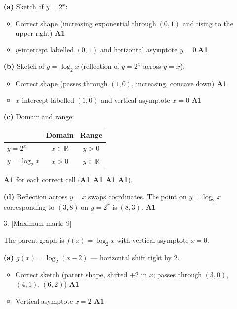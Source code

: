 \documentclass[12pt, twoside]{article}
\begin{document}
\begin{enumerate}[itemsep=0.3cm]
\textbf{(a)} Sketch of $y = 2^x$:
\begin{itemize}\setlength\itemsep{0pt}
  \item Correct shape (increasing exponential through $(0,1)$ and rising to
  the upper-right) \hfill \textbf{A1}
  \item $y$-intercept labelled $(0, 1)$ and horizontal asymptote $y = 0$
  \hfill \textbf{A1}
\end{itemize}

\smallskip

\textbf{(b)} Sketch of $y = \log_2 x$ (reflection of $y = 2^x$ across
$y = x$):
\begin{itemize}\setlength\itemsep{0pt}
  \item Correct shape (passes through $(1,0)$, increasing, concave down)
  \hfill \textbf{A1}
  \item $x$-intercept labelled $(1, 0)$ and vertical asymptote $x = 0$
  \hfill \textbf{A1}
\end{itemize}

\smallskip

\textbf{(c)} Domain and range:

\begin{center}
\renewcommand{\arraystretch}{1.4}
\begin{tabular}{| l | c | c |}
\hline
 & Domain & Range \\
\hline
$y = 2^x$ & $x \in \mathbb{R}$ & $y > 0$ \\
\hline
$y = \log_2 x$ & $x > 0$ & $y \in \mathbb{R}$ \\
\hline
\end{tabular}
\end{center}

\textbf{A1} for each correct cell (\textbf{A1 A1 A1 A1}).

\smallskip

\textbf{(d)} Reflection across $y = x$ swaps coordinates. The point on
$y = \log_2 x$ corresponding to $(3, 8)$ on $y = 2^x$ is $(8, 3)$.
\hfill \textbf{A1}

\newpage

\item[3.] [Maximum mark: 9]

The parent graph is $f(x) = \log_2 x$ with vertical asymptote $x = 0$.

\textbf{(a)} $g(x) = \log_2(x - 2)$ \quad — horizontal shift right by $2$.

\begin{itemize}\setlength\itemsep{0pt}
  \item Correct sketch (parent shape, shifted $+2$ in $x$; passes through
  $(3, 0)$, $(4, 1)$, $(6, 2)$) \hfill \textbf{A1}
  \item Vertical asymptote $x = 2$ \hfill \textbf{A1}
\end{itemize}


\end{enumerate}
\end{document}
